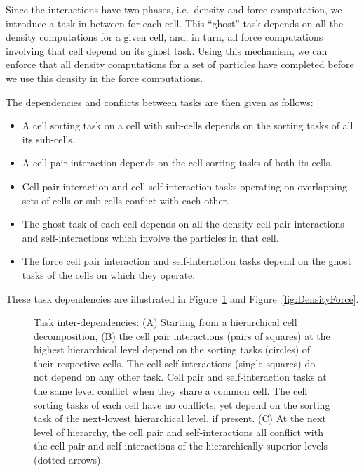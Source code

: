 \documentclass[final]{siamltex}
\newcommand{\fig}[1]
    {Figure~\ref{fig:#1}}
\begin{document}
Since the interactions have two phases, i.e.~density and force
computation, we introduce a task in between for each cell.
This ``ghost'' task depends on all the density computations
for a given cell, and, in turn, all force computations involving
that cell depend on its ghost task.
Using this mechanism, we can enforce that all density computations
for a set of particles have completed before we use this
density in the force computations.

The dependencies and conflicts between tasks are then given as follows:

\begin{itemize}

    \item A cell sorting task on a cell with sub-cells depends
        on the sorting tasks of all its sub-cells.

    \item A cell pair interaction depends on the cell sorting
        tasks of both its cells.
        
    \item Cell pair interaction and cell self-interaction tasks
        operating on overlapping sets of cells or sub-cells
        conflict with each other.
        
    \item The ghost task of each cell depends on all the density cell pair
        interactions and self-interactions which involve the particles
        in that cell.
        
    \item The force cell pair interaction and self-interaction tasks
        depend on the ghost tasks of the cells on which they operate.

\end{itemize}

\noindent These task dependencies are illustrated in \fig{Hierarchy} and
\fig{DensityForce}.

\begin{figure}[ht]
    \centerline{}
    
    \caption{Task inter-dependencies: ({\sf A}) Starting from a hierarchical
        cell decomposition, ({\sf B}) the cell pair interactions (pairs
        of squares) at the highest hierarchical level depend on the sorting
        tasks (circles) of their respective cells.
        The cell self-interactions (single squares) do not depend on any
        other task. Cell pair and self-interaction tasks at the
        same level conflict when they share a common cell. The
        cell sorting tasks of each cell have no conflicts, yet
        depend on the sorting task of the next-lowest hierarchical level,
        if present.
        ({\sf C)} At the next level of hierarchy, the cell pair and
        self-interactions all conflict with the cell pair and self-interactions
        of the hierarchically superior levels (dotted arrows).
        }
    \label{fig:Hierarchy}
\end{figure}
\end{document}
